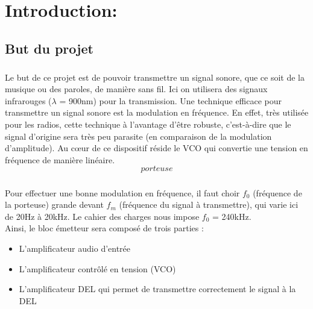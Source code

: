 \documentclass[a4paper]{report}
\begin{document}
\tableofcontents



\newpage


\flushleft
	
\chapter{Introduction:}

\section{But du projet}

\paragraph{}

Le but de ce projet est de pouvoir transmettre un signal sonore, que ce soit de la musique ou des paroles, de manière sans fil. Ici on utilisera des signaux infrarouges ($\lambda$ = 900nm) pour la transmission. Une technique efficace pour transmettre un signal sonore est la modulation en fréquence. En effet, très utilisée pour les radios, cette technique à l'avantage d'être robuste, c'est-à-dire que le signal d'origine sera très peu parasite (en comparaison de la modulation d'amplitude). Au cœur de ce dispositif réside le VCO qui convertie une tension en fréquence de manière linéaire.\\

$$porteuse$$

\paragraph{}

Pour effectuer une bonne modulation en fréquence, il faut choir $f_0$ (fréquence de la porteuse) grande devant $f_m$ (fréquence du signal à transmettre), qui varie ici de 20Hz à 20kHz. Le cahier des charges nous impose $f_0$ = 240kHz.\\
\vspace{0.2cm}
Ainsi, le bloc émetteur sera composé de trois parties : 
\begin{itemize}
	\item L'amplificateur audio d'entrée
	\item L'amplificateur contrôlé en tension (VCO)
	\item L'amplificateur DEL qui permet de transmettre correctement le signal à la DEL
\end{itemize}
\end{document}
